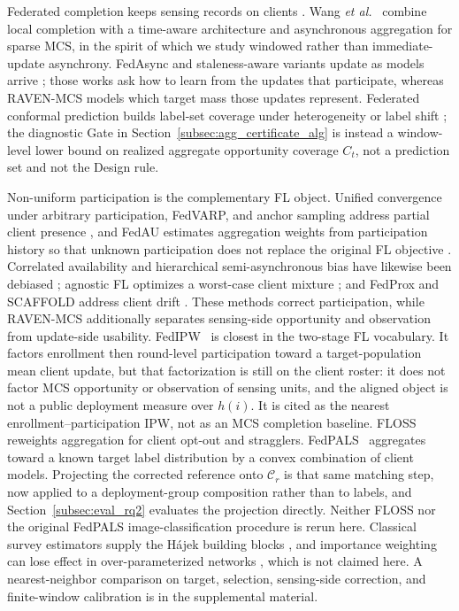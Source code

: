 \documentclass[letterpaper,journal]{IEEEtran}
\begin{document}
Federated completion keeps sensing records on clients
\cite{mcmahan2017communication,yang2019federated,kairouz2021advances,li2020federated}.
Wang \emph{et al.}~\cite{wang2026federated} combine local completion with a
time-aware architecture and asynchronous aggregation for sparse MCS, in the
spirit of which we study windowed rather than immediate-update asynchrony.
FedAsync and staleness-aware variants update as models arrive
\cite{xie2019asynchronous,liu2023adaptive,sun2024staleness,islam2025seafl,li2026stdfl};
those works ask how to learn from the updates that participate, whereas
RAVEN-MCS models which target mass those updates represent.  Federated conformal
prediction builds label-set coverage under heterogeneity or label shift
\cite{lu2023federated,plassier2023conformal}; the diagnostic Gate in
Section~\ref{subsec:agg_certificate_alg} is instead a window-level lower bound on
realized aggregate opportunity coverage $C_t$, not a prediction set and not the
Design rule.

Non-uniform participation is the complementary FL object.  Unified convergence
under arbitrary participation, FedVARP, and anchor sampling address partial
client presence \cite{wang2022unified,jhunjhunwala2022fedvarp,wu2023anchor}, and
FedAU estimates aggregation weights from participation history so that unknown
participation does not replace the original FL objective
\cite{wang2024lightweight}.  Correlated availability and hierarchical
semi-asynchronous bias have likewise been debiased
\cite{sun2025debiasing,chen2026fedcure}; agnostic FL optimizes a worst-case
client mixture \cite{mohri2019agnostic}; and FedProx and SCAFFOLD address client
drift \cite{li2020fedprox,karimireddy2020scaffold}.  These methods correct
participation, while RAVEN-MCS additionally separates sensing-side opportunity
and observation from update-side usability.  FedIPW~\cite{morishita2026who} is
closest in the two-stage FL vocabulary.  It factors enrollment then round-level
participation toward a target-population mean client update, but that
factorization is still on the client roster: it does not factor MCS opportunity
or observation of sensing units, and the aligned object is not a public
deployment measure over $h(i)$.  It is cited as the nearest
enrollment--participation IPW, not as an MCS completion baseline.
FLOSS~\cite{goetze2025floss} reweights aggregation for client
opt-out and stragglers.  FedPALS~\cite{listozec2024overcoming} aggregates toward
a known target label distribution by a convex combination of client models.
Projecting the corrected reference onto $\mathcal{C}_r$ is that same matching
step, now applied to a deployment-group composition rather than to labels, and
Section~\ref{subsec:eval_rq2} evaluates the projection directly.  Neither FLOSS
nor the original FedPALS image-classification procedure is rerun here.
Classical survey estimators supply the H\'ajek building blocks
\cite{horvitz1952generalization,hajek1971comment,shimodaira2000covariate,robins1994estimation},
and importance weighting can lose effect in over-parameterized networks
\cite{byrd2019importance}, which is not claimed here.  A nearest-neighbor
comparison on target, selection, sensing-side correction, and finite-window
calibration is in the supplemental material.
\end{document}
